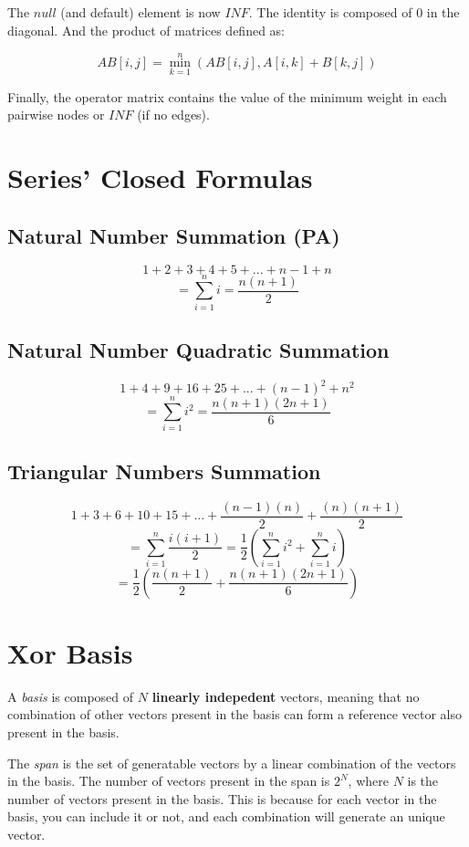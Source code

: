The $null$ (and default) element is now $INF$. The identity is composed of $0$ in the diagonal.
And the product of matrices defined as:

$$ AB[i, j] = \min^{n}_{k=1} (AB[i, j], A[i,k] + B[k, j]) $$

Finally, the operator matrix contains the value of the minimum weight in each pairwise nodes or $INF$ (if no edges). 

\section{Series' Closed Formulas}

\subsection{Natural Number Summation (PA)}

$$ 1 + 2 + 3 + 4 + 5 + ... + n-1 + n $$
$$ = \sum_{i=1}^n i = \frac{ n(n+1) }{ 2 } $$

\subsection{Natural Number Quadratic Summation}

$$ 1 + 4 + 9 + 16 + 25 + ... + (n-1)^2 + n^2 $$
$$ = \sum_{i=1}^n i^2 = \frac{ n(n+1)(2n+1) }{ 6 } $$

\subsection{Triangular Numbers Summation}

$$ 1 + 3 + 6 + 10 + 15 + ... + \frac{(n-1)(n)}{2} + \frac{(n)(n+1)}{2} $$
$$ = \sum_{i=1}^n \frac{i(i+1)}{2} = \frac{1}{2}(\sum_{i=1}^n i^2 + \sum_{i=1}^n i) $$
$$ = \frac{1}{2} ( \frac{ n(n+1) }{ 2 } + \frac{ n(n+1)(2n+1) }{ 6 }) $$

\section{Xor Basis}

A \textit{basis} is composed of $N$ \textbf{linearly indepedent} vectors, 
meaning that no combination of other vectors present in the basis can form a reference vector also present in the basis.

The \textit{span} is the set of generatable vectors by a linear combination of the vectors in the basis.
The number of vectors present in the span is $2^N$, where $N$ is the number of vectors present in the basis.
This is because for each vector in the basis, you can include it or not, and each combination will generate an unique vector.

